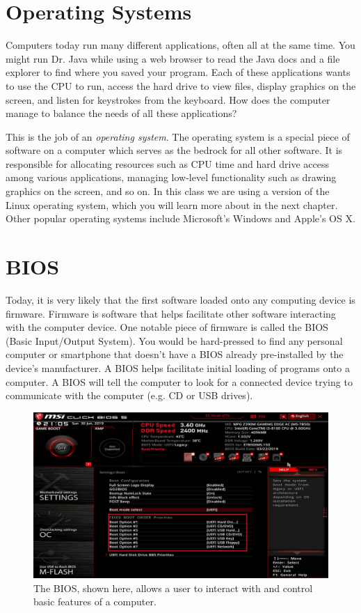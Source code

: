 \section{Operating Systems}

Computers today run many different applications, often all at the same time. You might run Dr. Java while using a web browser to read the Java docs and a file explorer to find where you saved your program. Each of these applications wants to use the CPU to run, access the hard drive to view files, display graphics on the screen, and listen for keystrokes from the keyboard. How does the computer manage to balance the needs of all these applications?

This is the job of an \emph{operating system}. The operating system is a special piece of software on a computer which serves as the bedrock for all other software. It is responsible for allocating resources such as CPU time and hard drive access among various applications, managing low-level functionality such as drawing graphics on the screen, and so on. In this class we are using a version of the Linux operating system, which you will learn more about in the next chapter. Other popular operating systems include Microsoft's Windows and Apple's OS X.

\section{BIOS}

Today, it is very likely that the first software loaded onto any computing device is firmware. Firmware is software that helps facilitate other software interacting with the computer device. One notable piece of firmware is called the BIOS (Basic Input/Output System). You would be hard-pressed to find any personal computer or smartphone that doesn't have a BIOS already pre-installed by the device's manufacturer. A BIOS helps facilitate initial loading of programs onto a computer. A BIOS will tell the computer to look for a connected device trying to communicate with the computer (e.g. CD or USB drives). 

\begin{figure}
    \centering
    \includegraphics[width=\textwidth]{images/bios.jpg}
    \caption{The BIOS, shown here, allows a user to interact with and control basic features of a computer.}
    \label{fig:hw_sw:bios}
\end{figure}

